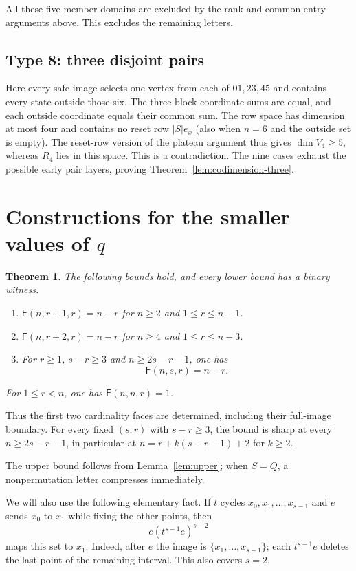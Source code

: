 \documentclass[11pt]{article}
\newtheorem{theorem}{Theorem}
\theoremstyle{definition}
\theoremstyle{plain}
\newcommand{\Max}{\mathsf F}
\begin{document}
All these five-member domains are excluded by the rank and common-entry
arguments above. This excludes the remaining letters.

\subsection{Type 8: three disjoint pairs}

Here every safe image selects one vertex from each of \(01,23,45\) and
contains every state outside those six. The three block-coordinate sums
are equal, and each outside coordinate equals their common sum. The row
space has dimension at most four and contains no reset row \(|S|e_x\)
(also when \(n=6\) and the outside set is empty). The reset-row version
of the plateau argument thus gives \(\dim V_4\ge5\), whereas \(R_4\)
lies in this space. This is a contradiction. The nine cases exhaust
the possible early pair layers, proving
Theorem~\ref{lem:codimension-three}.

\section{Constructions for the smaller values of \texorpdfstring{$q$}{q}}\label{sec:appendix}
\begin{theorem}\label{thm:sharp-faces}
The following bounds hold, and every lower bound has a binary witness.
\begin{enumerate}
\item $\Max(n,r+1,r)=n-r$ for $n\ge2$ and $1\le r\le n-1$.
\item $\Max(n,r+2,r)=n-r$ for $n\ge4$ and $1\le r\le n-3$.
\item For $r\ge1$, $s-r\ge3$ and $n\ge2s-r-1$, one has
\[
 \Max(n,s,r)=n-r.
\]
\end{enumerate}
For $1\le r<n$, one has $\Max(n,n,r)=1$.
\end{theorem}
Thus the first two cardinality faces are determined, including their full-image boundary. For every fixed $(s,r)$ with $s-r\ge3$, the bound is sharp at every $n\ge2s-r-1$, in particular at $n=r+k(s-r-1)+2$ for $k\ge2$.

The upper bound follows from Lemma~\ref{lem:upper}; when $S=Q$,
a nonpermutation letter compresses immediately.

We will also use the following elementary fact. If $t$ cycles $x_0,x_1,\ldots,x_{s-1}$ and $e$ sends $x_0$ to $x_1$ while fixing the other points, then
\begin{equation}\label{eq:unit}
 e(t^{s-1}e)^{s-2}
\end{equation}
maps this set to $x_1$. Indeed, after $e$ the image is $\{x_1,\ldots,x_{s-1}\}$; each $t^{s-1}e$ deletes the last point of the remaining interval. This also covers $s=2$.
\end{document}
